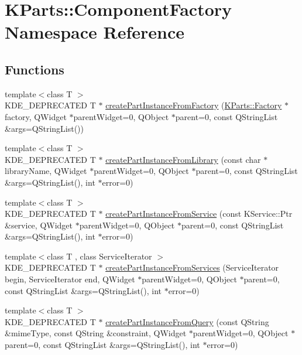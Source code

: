\hypertarget{namespaceKParts_1_1ComponentFactory}{\section{K\+Parts\+:\+:Component\+Factory Namespace Reference}
\label{namespaceKParts_1_1ComponentFactory}
}
\subsection*{Functions}
\begin{DoxyCompactItemize}
\item 
{\footnotesize template$<$class T $>$ }\\K\+D\+E\+\_\+\+D\+E\+P\+R\+E\+C\+A\+T\+E\+D T $\ast$ \hyperlink{namespaceKParts_1_1ComponentFactory_a912a99f55a6cd314f0519bdc8b6b53be}{create\+Part\+Instance\+From\+Factory} (\hyperlink{classKParts_1_1Factory}{K\+Parts\+::\+Factory} $\ast$factory, Q\+Widget $\ast$parent\+Widget=0, Q\+Object $\ast$parent=0, const Q\+String\+List \&args=Q\+String\+List())
\item 
{\footnotesize template$<$class T $>$ }\\K\+D\+E\+\_\+\+D\+E\+P\+R\+E\+C\+A\+T\+E\+D T $\ast$ \hyperlink{namespaceKParts_1_1ComponentFactory_a9fbd68a5b3a1e872dd6ae181fff65136}{create\+Part\+Instance\+From\+Library} (const char $\ast$library\+Name, Q\+Widget $\ast$parent\+Widget=0, Q\+Object $\ast$parent=0, const Q\+String\+List \&args=Q\+String\+List(), int $\ast$error=0)
\item 
{\footnotesize template$<$class T $>$ }\\K\+D\+E\+\_\+\+D\+E\+P\+R\+E\+C\+A\+T\+E\+D T $\ast$ \hyperlink{namespaceKParts_1_1ComponentFactory_a85bb410165e80f12e79a45c2e3ab39ce}{create\+Part\+Instance\+From\+Service} (const K\+Service\+::\+Ptr \&service, Q\+Widget $\ast$parent\+Widget=0, Q\+Object $\ast$parent=0, const Q\+String\+List \&args=Q\+String\+List(), int $\ast$error=0)
\item 
{\footnotesize template$<$class T , class Service\+Iterator $>$ }\\K\+D\+E\+\_\+\+D\+E\+P\+R\+E\+C\+A\+T\+E\+D T $\ast$ \hyperlink{namespaceKParts_1_1ComponentFactory_ad56c0a6af0a338e56dc3e2613073b195}{create\+Part\+Instance\+From\+Services} (Service\+Iterator begin, Service\+Iterator end, Q\+Widget $\ast$parent\+Widget=0, Q\+Object $\ast$parent=0, const Q\+String\+List \&args=Q\+String\+List(), int $\ast$error=0)
\item 
{\footnotesize template$<$class T $>$ }\\K\+D\+E\+\_\+\+D\+E\+P\+R\+E\+C\+A\+T\+E\+D T $\ast$ \hyperlink{namespaceKParts_1_1ComponentFactory_aaa10d0b82f1e3de6e36eae47b8c8aa17}{create\+Part\+Instance\+From\+Query} (const Q\+String \&mime\+Type, const Q\+String \&constraint, Q\+Widget $\ast$parent\+Widget=0, Q\+Object $\ast$parent=0, const Q\+String\+List \&args=Q\+String\+List(), int $\ast$error=0)
\end{DoxyCompactItemize}


